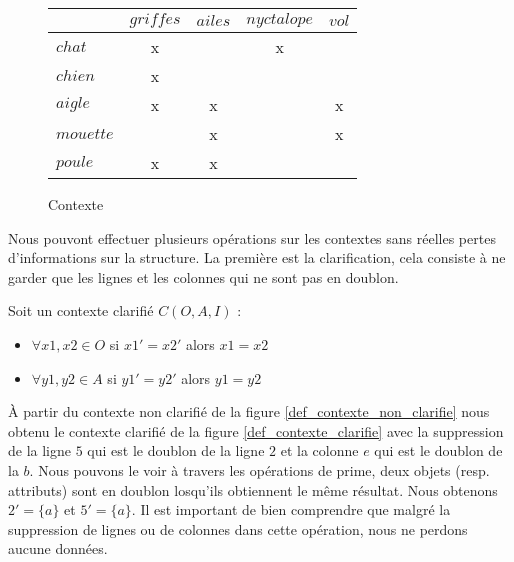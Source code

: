 \begin{figure}[H]
	\begin{center}
		\begin{tabular}{ l | c c c c }
			 & $griffes$ & $ailes$ & $nyctalope$ & $vol$ \\
			\hline
			$chat$ & x & & x & \\
			$chien$ & x & & & \\
			$aigle$ & x & x & & x \\
			$mouette$ & & x & & x \\
			$poule$ & x & x & & \\
		\end{tabular}
	\end{center}
	\caption{Contexte}
	\label{def_contexte}
\end{figure} 

Nous pouvont effectuer plusieurs opérations sur les contextes sans réelles pertes d'informations sur la structure. La première est la clarification, cela consiste à ne garder que les lignes et les colonnes qui ne sont pas en doublon.

\begin{definition}
Soit un contexte clarifié $C(O, A, I)$ :
\begin{itemize}
	\item $\forall x1, x2 \in O$ si ${x1}' = {x2}'$ alors $x1 = x2$
	\item $\forall y1, y2 \in A$ si ${y1}' = {y2}'$ alors $y1 = y2$
\end{itemize}
\end{definition}

À partir du contexte non clarifié de la figure \ref{def_contexte_non_clarifie} nous obtenu le contexte clarifié de la figure \ref{def_contexte_clarifie} avec la suppression de la ligne $5$ qui est le doublon de la ligne $2$ et la colonne $e$ qui est le doublon de la $b$. Nous pouvons le voir à travers les opérations de prime, deux objets (resp. attributs) sont en doublon losqu'ils obtiennent le même résultat. Nous obtenons $2' = \{a\}$ et $5' = \{a\}$. Il est important de bien comprendre que malgré la suppression de lignes ou de colonnes dans cette opération, nous ne perdons aucune données.

